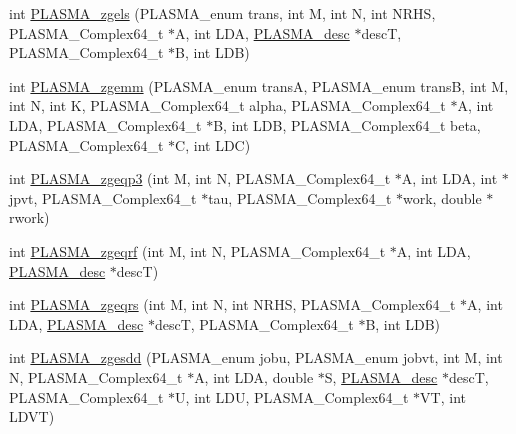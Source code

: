 \begin{DoxyCompactItemize}
int \hyperlink{group__PLASMA__Complex64__t_ga37e31dd7208585a1720db61e38e31a55_ga37e31dd7208585a1720db61e38e31a55}{P\+L\+A\+S\+M\+A\+\_\+zgels} (P\+L\+A\+S\+M\+A\+\_\+enum trans, int M, int N, int N\+R\+H\+S, P\+L\+A\+S\+M\+A\+\_\+\+Complex64\+\_\+t $\ast$A, int L\+D\+A, \hyperlink{structplasma__desc__t}{P\+L\+A\+S\+M\+A\+\_\+desc} $\ast$desc\+T, P\+L\+A\+S\+M\+A\+\_\+\+Complex64\+\_\+t $\ast$B, int L\+D\+B)
\item 
int \hyperlink{group__PLASMA__Complex64__t_ga1a0f8d759e535f9947ae11baa0af6fa3_ga1a0f8d759e535f9947ae11baa0af6fa3}{P\+L\+A\+S\+M\+A\+\_\+zgemm} (P\+L\+A\+S\+M\+A\+\_\+enum trans\+A, P\+L\+A\+S\+M\+A\+\_\+enum trans\+B, int M, int N, int K, P\+L\+A\+S\+M\+A\+\_\+\+Complex64\+\_\+t alpha, P\+L\+A\+S\+M\+A\+\_\+\+Complex64\+\_\+t $\ast$A, int L\+D\+A, P\+L\+A\+S\+M\+A\+\_\+\+Complex64\+\_\+t $\ast$B, int L\+D\+B, P\+L\+A\+S\+M\+A\+\_\+\+Complex64\+\_\+t beta, P\+L\+A\+S\+M\+A\+\_\+\+Complex64\+\_\+t $\ast$C, int L\+D\+C)
\item 
int \hyperlink{group__PLASMA__Complex64__t_ga8c6ffd25fb20c4c7398133141910a8a6_ga8c6ffd25fb20c4c7398133141910a8a6}{P\+L\+A\+S\+M\+A\+\_\+zgeqp3} (int M, int N, P\+L\+A\+S\+M\+A\+\_\+\+Complex64\+\_\+t $\ast$A, int L\+D\+A, int $\ast$jpvt, P\+L\+A\+S\+M\+A\+\_\+\+Complex64\+\_\+t $\ast$tau, P\+L\+A\+S\+M\+A\+\_\+\+Complex64\+\_\+t $\ast$work, double $\ast$rwork)
\item 
int \hyperlink{group__PLASMA__Complex64__t_ga9d4fae8697b364c384faa7480aea3118_ga9d4fae8697b364c384faa7480aea3118}{P\+L\+A\+S\+M\+A\+\_\+zgeqrf} (int M, int N, P\+L\+A\+S\+M\+A\+\_\+\+Complex64\+\_\+t $\ast$A, int L\+D\+A, \hyperlink{structplasma__desc__t}{P\+L\+A\+S\+M\+A\+\_\+desc} $\ast$desc\+T)
\item 
int \hyperlink{group__PLASMA__Complex64__t_gaaded5cbc1a55a5d1cc6a231b8da07bf0_gaaded5cbc1a55a5d1cc6a231b8da07bf0}{P\+L\+A\+S\+M\+A\+\_\+zgeqrs} (int M, int N, int N\+R\+H\+S, P\+L\+A\+S\+M\+A\+\_\+\+Complex64\+\_\+t $\ast$A, int L\+D\+A, \hyperlink{structplasma__desc__t}{P\+L\+A\+S\+M\+A\+\_\+desc} $\ast$desc\+T, P\+L\+A\+S\+M\+A\+\_\+\+Complex64\+\_\+t $\ast$B, int L\+D\+B)
\item 
int \hyperlink{group__PLASMA__Complex64__t_ga4550f69e64e28c5b19e82345a4c4fad0_ga4550f69e64e28c5b19e82345a4c4fad0}{P\+L\+A\+S\+M\+A\+\_\+zgesdd} (P\+L\+A\+S\+M\+A\+\_\+enum jobu, P\+L\+A\+S\+M\+A\+\_\+enum jobvt, int M, int N, P\+L\+A\+S\+M\+A\+\_\+\+Complex64\+\_\+t $\ast$A, int L\+D\+A, double $\ast$S, \hyperlink{structplasma__desc__t}{P\+L\+A\+S\+M\+A\+\_\+desc} $\ast$desc\+T, P\+L\+A\+S\+M\+A\+\_\+\+Complex64\+\_\+t $\ast$U, int L\+D\+U, P\+L\+A\+S\+M\+A\+\_\+\+Complex64\+\_\+t $\ast$V\+T, int L\+D\+V\+T)

\end{DoxyCompactItemize}
